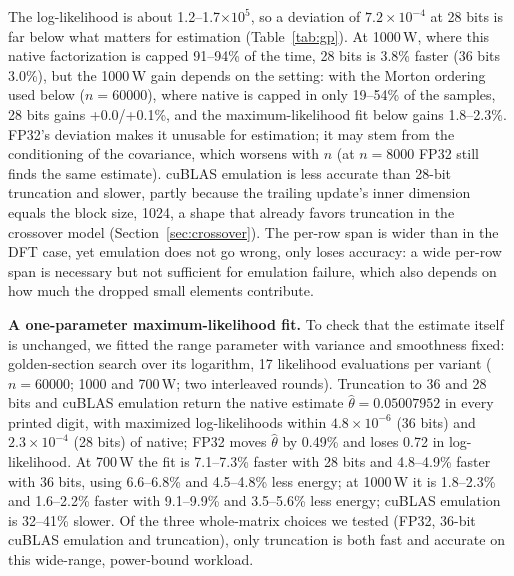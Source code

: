 \documentclass[conference]{IEEEtran}
\newcommand{\W}{\,W}
\newcommand{\ee}[2]{#1{\times}10^{#2}}  %
\newcommand{\pct}{\%}
\begin{document}
The log-likelihood is about 1.2--1.7$\times10^5$, so a deviation of $\ee{7.2}{-4}$ at 28 bits is far below what
matters for estimation (Table~\ref{tab:gp}). At 1000\W, where this native factorization is capped 91--94\pct{} of
the time, 28 bits is 3.8\pct{} faster (36 bits 3.0\pct), but the 1000\W{} gain depends on the setting:
with the Morton ordering used below ($n=60000$), where native is capped in only 19--54\pct{} of the samples, 28 bits
gains +0.0/+0.1\pct, and the maximum-likelihood fit below gains 1.8--2.3\pct. FP32's deviation makes it unusable for
estimation; it may stem from the conditioning of the covariance, which worsens with $n$ (at $n=8000$ FP32 still finds
the same estimate).
cuBLAS emulation is less accurate than 28-bit truncation and slower, partly because the trailing update's inner
dimension equals the block size, 1024, a shape that already favors truncation in the crossover model
(Section~\ref{sec:crossover}). The per-row span is wider than in the DFT case, yet emulation does not go wrong, only
loses accuracy: a wide per-row span is necessary but not sufficient for emulation failure, which also depends on how
much the dropped small elements contribute.

\textbf{A one-parameter maximum-likelihood fit.} To check that the estimate itself is unchanged, we fitted the range
parameter with variance and smoothness fixed: golden-section search over its logarithm, 17 likelihood evaluations
per variant ($n=60000$; 1000 and 700\W; two interleaved rounds). Truncation to 36 and 28 bits and cuBLAS emulation
return the native estimate
$\hat\theta=0.05007952$ in every printed digit, with maximized log-likelihoods within $\ee{4.8}{-6}$ (36 bits) and
$\ee{2.3}{-4}$ (28 bits) of native; FP32 moves $\hat\theta$ by 0.49\pct{} and loses 0.72 in log-likelihood. At
700\W{} the fit is 7.1--7.3\pct{} faster with 28 bits
and 4.8--4.9\pct{} faster with 36 bits, using 6.6--6.8\pct{} and 4.5--4.8\pct{} less energy; at 1000\W{} it is
1.8--2.3\pct{} and 1.6--2.2\pct{} faster with 9.1--9.9\pct{} and 3.5--5.6\pct{} less energy; cuBLAS emulation is
32--41\pct{} slower. Of the three whole-matrix choices we tested (FP32, 36-bit cuBLAS emulation and truncation), only
truncation is both fast and accurate on this wide-range, power-bound workload.
\end{document}
